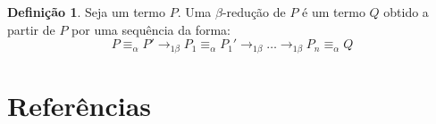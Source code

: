 \documentclass[12pt]{article}
\theoremstyle{definition}
\newtheorem{definition}[theorem]{Definição}
\begin{document}
\begin{definition}
  Seja um termo $P$. Uma $\beta$-redução de $P$ é um termo $Q$ obtido a partir de $P$ por uma sequência da forma:
  $$P \equiv_\alpha P' \to_{1 \beta} P_1 \equiv_\alpha P_1' \to_{1 \beta} \ldots \to_{1 \beta} P_n \equiv_\alpha Q$$
\end{definition}

\section{Referências}

\nocite{*}


\end{document}
